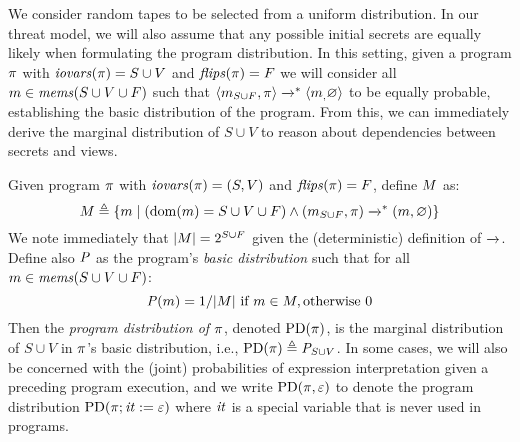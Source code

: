 We consider random tapes to be selected from a uniform distribution.
In our threat model, we will also assume that any possible initial
secrets are equally likely when formulating the program distribution.
In this setting, given a program $\pi$ with $\mathit{iovars}(\pi) = S \cup
V$ and $\mathit{flips}(\pi) = F$ we will consider all $m
\in \mathit{mems}(S \cup V \cup F)$ such that
$
\langle m_{S \cup F},\pi \rangle \xrightarrow{}^{*} \langle m_,\varnothing \rangle
$
to be equally probable, establishing the basic distribution of the
program. From this, we can immediately derive the marginal distribution
of $S \cup V$ to reason about dependencies between secrets and views. 
\begin{definition}
  \label{def-progd}
  \label{definition-progd}
  Given program $\pi$ with $\mathit{iovars}(\pi) = (S,V)$ and $\mathit{flips}(\pi) = F$, define $M$ as:
  $$
  M \triangleq \{ m \mid (\mathrm{dom}(m) = S \cup V \cup F) \wedge (m_{S \cup F},\pi) \xrightarrow{}^{*} (m,\varnothing) \}
  $$
  We note immediately that $|M| = 2^{S \cup F}$ given the (deterministic) definition of $\xrightarrow{}$. 
  Define also $\mathit{P}$ as the program's \emph{basic distribution} such that for all
  $m \in \mathit{mems}(S \cup V \cup F)$:
  $$
  \mathit{P}(m) =  1 / |M| \ \text{if}\ m \in M, \text{otherwise}\ 0
  $$
  Then the \emph{program distribution of $\pi$}, denoted $\mathrm{PD}(\pi)$, is the
  marginal distribution of $S \cup V$ in $\pi$'s basic distribution, i.e., 
  $
  \mathrm{PD}(\pi) \triangleq  {\mathit{P}}_{S\cup V}
  $.
  In some cases, we will also be concerned with the (joint)
  probabilities of expression interpretation given a preceding program
  execution, and we write $\mathrm{PD}(\pi, \varepsilon)$ to denote the program
  distribution $\mathrm{PD}(\pi;\mathit{it} := \varepsilon)$ where $\mathit{it}$ is a
  special variable that is never used in programs.
\end{definition}



